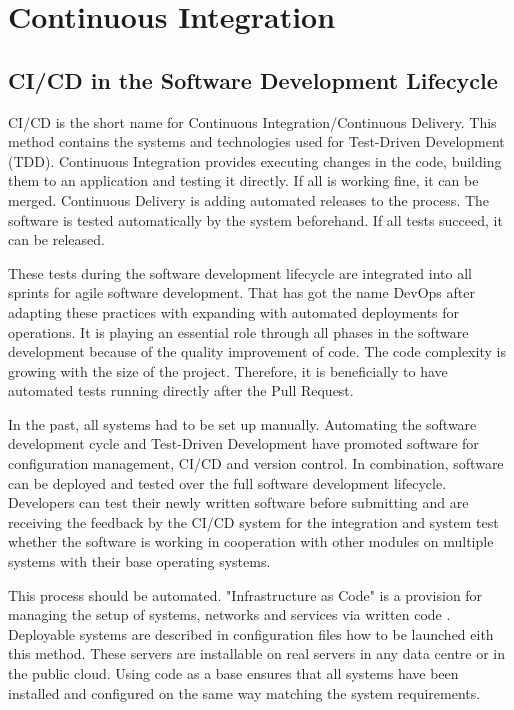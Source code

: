 \chapter{Continuous Integration}\label{ch:ci_cd}

\section{CI/CD in the Software Development Lifecycle}

\gls{CI/CD} is the short name for Continuous Integration/Continuous Delivery. This method contains the systems and technologies used for Test-Driven Development (TDD). Continuous Integration provides executing changes in the code, building them to an application and testing it directly. 
If all is working fine, it can be merged. Continuous Delivery is adding automated releases to the process. 
The software is tested automatically by the system beforehand. If all tests succeed, it can be released.

These tests during the software development lifecycle are integrated into all sprints for agile software development. That has got the name DevOps after adapting these practices with expanding with automated deployments for operations. It is playing an essential role through all phases in the software development because of the quality improvement of code. The code complexity is growing with the size of the project. Therefore, it is beneficially to have automated tests running directly after the Pull Request. 

In the past, all systems had to be set up manually. Automating the software development cycle and Test-Driven Development  have promoted software for configuration management, \gls{CI/CD} and version control. In combination, software can be deployed and tested over the full software development lifecycle. Developers can test their newly written software before submitting and are receiving the feedback by the \gls{CI/CD} system for the integration and system test whether the software is working in cooperation with other modules on multiple systems with their base operating systems.

This process should be automated. "Infrastructure as Code" is a provision for managing the setup of systems, networks and services via written code \cite[~p.110]{Scholl2019}. Deployable systems are described in configuration files how to be launched eith this method. These servers are installable on real servers in any data centre or in the public cloud. Using code as a base ensures that all systems have been installed and configured on the same way matching the system requirements. 

